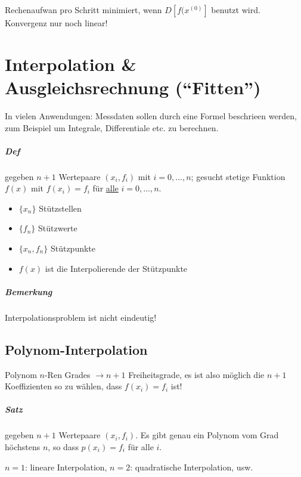 \documentclass[a4paper,ngerman]{scrbook}
\begin{document}
Rechenaufwan pro Schritt minimiert, wenn $D[f(x^{(0)}]$ benutzt wird. Konvergenz nur noch linear!

\chapter{Interpolation \& Ausgleichsrechnung ("`Fitten"')}
\label{chap:fitten}

In vielen Anwendungen: Messdaten sollen durch eine Formel beschrieen werden, zum Beispiel um Integrale, Differentiale etc\@. zu berechnen.

\paragraph{Def}

gegeben $n+1$ Wertepaare $(x_i,f_i)$ mit $i=0,\dots,n$; gesucht stetige Funktion $f(x)$ mit $f(x_i) = f_i$ für \underline{alle} $i=0,\dots,n$.

\begin{itemize}
\item $\{x_n\}$ Stützstellen
\item $\{f_n\}$ Stützwerte
\item $\{x_n,f_n\}$ Stützpunkte
\item $f(x)$ ist die Interpolierende der Stützpunkte
\end{itemize}
\paragraph{Bemerkung}

Interpolationsproblem ist nicht eindeutig!


\section{Polynom-Interpolation}
\label{sec:interpo}

Polynom $n$-Ren Grades $\to n+1$ Freiheitsgrade, es ist also möglich die $n+1$ Koeffizienten so zu wählen, dass $f(x_i) = f_i$ ist!

\paragraph{Satz}

gegeben $n+1$ Wertepaare $(x_i,f_i)$. Es gibt genau ein Polynom vom Grad höchstens $n$, so dass $p(x_i) = f_i$ für alle $i$.

$n = 1$: lineare Interpolation, $n=2$: quadratische Interpolation, usw.
\end{document}
